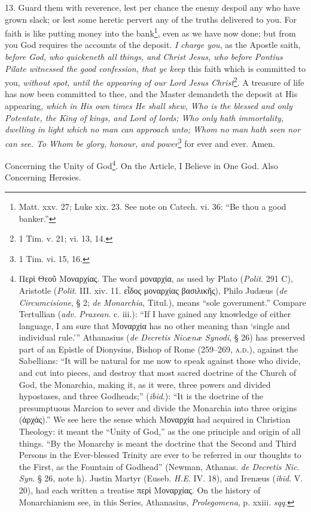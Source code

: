 13. Guard them with reverence, lest per chance the enemy despoil any who have grown slack; or lest some heretic pervert any of the truths delivered to you. For faith is like putting money into the bank\footnote{Matt. xxv. 27; Luke xix. 23. See note on Catech. vi. 36: “Be thou a good banker.”}, even as we have now done; but from you God requires the accounts of the deposit. \emph{I charge you}, as the Apostle saith, \emph{before God, who quickeneth all things, and Christ Jesus, who before Pontius Pilate witnessed the good confession, that ye keep} this faith which is committed to you, \emph{without spot, until the appearing of our Lord Jesus Christ}\footnote{1 Tim. v. 21; vi. 13, 14.}. A treasure of life has now been committed to thee, and the Master demandeth the deposit at His appearing, \emph{which in His own times He shall shew, Who is the blessed and only Potentate, the King of kings, and Lord of lords; Who only hath immortality, dwelling in light which no man can approach unto; Whom no man hath seen nor can see. To Whom be glory, honour, and power}\footnote{1 Tim. vi. 15, 16.} for ever and ever. Amen.


Concerning the Unity of God\footnote{\textgreek{Περὶ Θεοῦ Μοναρχίας}. The word \textgreek{μοναρχία}, as used by Plato (\emph{Polit}. 291 C), Aristotle (\emph{Polit}. III. xiv. 11. \textgreek{εἶδος μοναρχίας βασιλικῆς}), Philo Judæus (\emph{de Circumcisione}, § 2; \emph{de Monarchia}, Titul.), means “sole government.” Compare Tertullian (\emph{adv. Praxean}. c. iii.): “If I have gained any knowledge of either language, I am sure that \textgreek{Μοναρχία} has no other meaning than ‘single and individual rule.’” Athanasius (\emph{de Decretis Nicænæ Synodi}, § 26) has preserved part of an Epistle of Dionysius, Bishop of Rome (259–269, \textsc{a.d}.), against the Sabellians: “It will be natural for me now to speak against those who divide, and cut into pieces, and destroy that most sacred doctrine of the Church of God, the Monarchia, making it, as it were, three powers and divided hypostases, and three Godheads;” (\emph{ibid}.): “It is the doctrine of the presumptuous Marcion to sever and divide the Monarchia into three origins (\textgreek{ἀρχάς}).” We see here the sense which \textgreek{Μοναρχία} had acquired in Christian Theology: it meant the “Unity of God,” as the one principle and origin of all things. “By the Monarchy is meant the doctrine that the Second and Third Persons in the Ever-blessed Trinity are ever to be referred in our thoughts to the First, as the Fountain of Godhead” (Newman, Athanas. \emph{de Decretis Nic}. \emph{Syn}. § 26, note h). Justin Martyr (Euseb. \emph{H.E}. IV. 18), and Irenæus (\emph{ibid}. V. 20), had each written a treatise \textgreek{περὶ Μοναρχίας}. On the history of Monarchianism see, in this Series, Athanasius, \emph{Prolegomena}, p. xxiii. \emph{sqq}.}. On the Article, I Believe in One God. Also Concerning Heresies.

